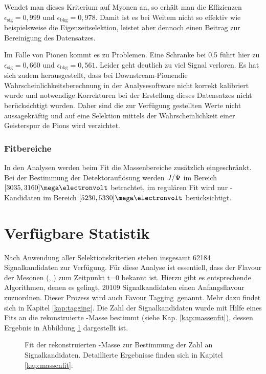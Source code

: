 Wendet man dieses Kriterium auf Myonen an, so erhält man die Effizienzen $\epsilon_{\text{sig}}=0,999$ und $\epsilon_{\text{bkg}}=0,978$. Damit ist es bei Weitem nicht so effektiv wie beispielsweise die Eigenzeitselektion, leistet aber dennoch einen Beitrag zur Bereinigung des Datensatzes.

Im Falle von Pionen kommt es zu Problemen. Eine Schranke bei 0,5 führt hier zu $\epsilon_{\text{sig}}=0,660$ und $\epsilon_{\text{bkg}}=0,561$. Leider geht deutlich zu viel Signal verloren. Es hat sich zudem herausgestellt, dass bei \glqq Downstream-Pionen\grqq die Wahrscheinlichkeitsberechnung in der Analysesoftware nicht korrekt kalibriert wurde und notwendige Korrekturen bei der Erstellung dieses Datensatzes nicht berücksichtigt wurden. Daher sind die zur Verfügung gestellten Werte nicht aussagekräftig und auf eine Selektion mittels der Wahrscheinlichkeit einer Geisterspur de Pions wird verzichtet.

\subsubsection{Fitbereiche}
In den Analysen werden beim Fit die Massenbereiche zusätzlich eingeschränkt. Bei der Bestimmung der Detektorauflösung werden $J/\Psi$ im Bereich $[3035, 3160]\mega\electronvolt$ betrachtet, im regulären Fit wird nur \Bd-Kandidaten im Bereich $[5230, 5330]\mega\electronvolt$ berücksichtigt.

\section{Verfügbare Statistik}
Nach Anwendung aller Selektionskriterien stehen insgesamt 62184 Signalkandidaten zur Verfügung. Für diese Analyse ist essentiell, dass der Flavour der Mesonen (\Bd, \Bdbar) zum Zeitpunkt t=0 bekannt ist. Hierzu gibt es entsprechende Algorithmen, denen es gelingt, 20109 Signalkandidaten einen Anfangsflavour zuzuordnen. Dieser Prozess wird auch \glqq Favour Tagging\grqq\ genannt. Mehr dazu findet sich in Kapitel \ref{kap:tagging}. Die Zahl der Signalkandidaten wurde mit Hilfe eines Fits an die rekonstruierte \Bd-Masse bestimmt (siehe Kap. \ref{kap:massenfit}), dessen Ergebnis in Abbildung \ref{fig:masse_allein} dargestellt ist.
\begin{figure}[hptb]
\centering
\caption{Fit der rekonstruierten \Bd-Masse zur Bestimmung der Zahl an Signalkandidaten. Detaillierte Ergebnisse finden sich in Kapitel \ref{kap:massenfit}.}
\label{fig:masse_allein}
\end{figure}
